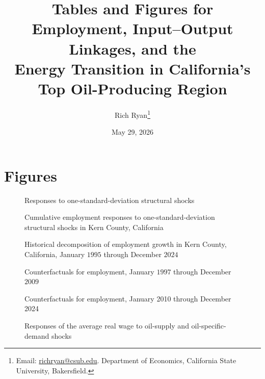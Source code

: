 \documentclass[12pt]{article}
\title{Tables and Figures for \\
  \textsf{\Large Employment, Input--Output Linkages, and the\\Energy Transition in California's Top Oil-Producing Region}}
\author{Rich Ryan\thanks{Email: \href{mailto:richryan@csub.edu}{richryan@csub.edu}. Department of Economics, California State University, Bakersfield.}}
\date{May 29, 2026}
\begin{document}
\maketitle

\section{Figures}

\begin{figure}[htbp]
  \centering
  \resizebox{\textwidth}{!}{
  }
\caption{Responses to one-standard-deviation structural shocks}
\end{figure}

\begin{figure}[htbp]
  \centering
  \resizebox{0.6\textwidth}{!}{
  }
\caption{Cumulative employment responses to one-standard-deviation structural shocks in Kern County, California}
\end{figure}

\begin{figure}[htbp]
  \centering
  \resizebox{0.8\textwidth}{!}{
  }
\caption{Historical decomposition of employment growth in Kern County, California,
January $1995$ through December $2024$}
\end{figure}


\begin{figure}[htbp]
  \centering
  \resizebox{\textwidth}{!}{
  }
\caption{Counterfactuals for employment, January $1997$ through December $2009$}
\end{figure}

\begin{figure}[htbp]
  \centering
  \resizebox{\textwidth}{!}{
  }
\caption{Counterfactuals for employment, January 2010 through December 2024}
\end{figure}

\begin{figure}[htbp]
  \centering
  \resizebox{\textwidth}{!}{
    
  }
  \caption[]{\label{fig:wage-oil-supply-shock} Responses of the average real wage to
    oil-supply and oil-specific-demand shocks}
\end{figure}
\end{document}

